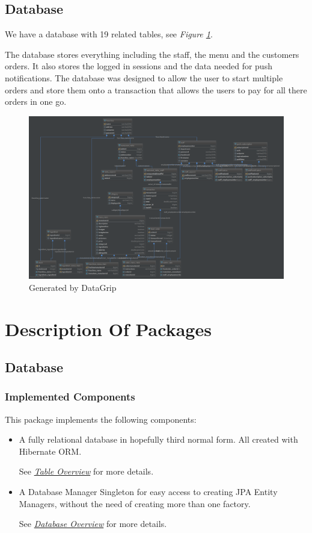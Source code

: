 \documentclass[12pt, twoside, a4paper]{report}
\begin{document}
\section*{Database}

We have a database with 19 related tables, see \textit{Figure \ref{fig:data}}. 

The database stores everything including the staff, the menu and the customers orders. 
It also stores the logged in sessions and the data needed for push notifications.
The database was designed to allow the user to start multiple orders and store them onto a transaction that allows the users to pay for all there orders in one go.

\begin{figure}[H]
  \centering
  \includegraphics[width=15cm]{database.png}
  \caption{Generated by DataGrip}
  \label{fig:data}
\end{figure}

\chapter*{Description Of Packages}
\section*{Database}\label{sec:database}
\subsection*{Implemented Components}
This package implements the following components:
\begin{itemize}
  \item A fully relational database in hopefully third normal form. All created with Hibernate ORM.

    See \textit{\href{run:../JavaDoc/database/tables/package-summary.html}{Table Overview}} for more details.
  \item A Database Manager Singleton for easy access to creating JPA Entity Managers, without the need of creating more than one factory.

    See \textit{\href{run:../JavaDoc/database/package-summary.html}{Database Overview}} for more details.
\end{itemize}
\end{document}
